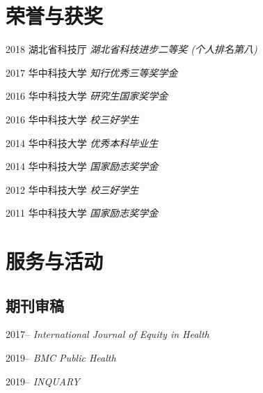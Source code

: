 \documentclass[12pt,letterpaper]{report}
\begin{document}
   
   
\section*{荣誉与获奖}

    \begin{tablist}
      
        \item[2018] \tab  湖北省科技厅  \space \textit{湖北省科技进步二等奖 (个人排名第八)}
        \item[2017] \tab  华中科技大学  \space \textit{知行优秀三等奖学金}
        \item[2016] \tab 华中科技大学  \space \textit{研究生国家奖学金}
        \item[2016] \tab 华中科技大学  \space \textit{校三好学生}
        \item[2014] \tab 华中科技大学  \space \textit{优秀本科毕业生}
        \item[2014] \tab 华中科技大学  \space \textit{国家励志奖学金}
        \item[2012] \tab 华中科技大学  \space \textit{校三好学生}
        \item[2011] \tab 华中科技大学   \space \textit{国家励志奖学金}

     \end{tablist}



        

   
\section*{服务与活动}

    \subsection*{期刊审稿}

    \begin{tablist}
    
    	 \item[2017-- ] \tab  \textit{International Journal of Equity in Health}
         \item[2019-- ] \tab   \textit{BMC Public Health}
         \item[2019-- ] \tab   \textit{INQUARY}
         
    \end{tablist}
	
\end{document}
